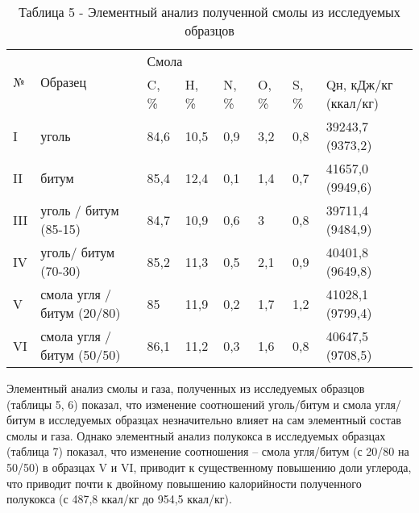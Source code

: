 \begin{table}[H]
\caption*{Таблица 5 - Элементный анализ полученной смолы из исследуемых образцов}
\centering
\begin{tabular}{|l|l|llllll|}
\hline
\multirow{2}{*}{№} & \multirow{2}{*}{Образец} & \multicolumn{6}{l|}{Смола} \\ \cline{3-8}
 &  & \multicolumn{1}{l|}{C, \%} & \multicolumn{1}{l|}{H, \%} & \multicolumn{1}{l|}{N, \%} & \multicolumn{1}{l|}{O, \%} & \multicolumn{1}{l|}{S, \%} & Qн, кДж/кг (ккал/кг) \\ \hline
I & уголь & \multicolumn{1}{l|}{84,6} & \multicolumn{1}{l|}{10,5} & \multicolumn{1}{l|}{0,9} & \multicolumn{1}{l|}{3,2} & \multicolumn{1}{l|}{0,8} & 39243,7 (9373,2) \\ \hline
II & битум & \multicolumn{1}{l|}{85,4} & \multicolumn{1}{l|}{12,4} & \multicolumn{1}{l|}{0,1} & \multicolumn{1}{l|}{1,4} & \multicolumn{1}{l|}{0,7} & 41657,0 (9949,6) \\ \hline
III & уголь / битум (85-15) & \multicolumn{1}{l|}{84,7} & \multicolumn{1}{l|}{10,9} & \multicolumn{1}{l|}{0,6} & \multicolumn{1}{l|}{3} & \multicolumn{1}{l|}{0,8} & 39711,4 (9484,9) \\ \hline
IV & уголь/ битум (70-30) & \multicolumn{1}{l|}{85,2} & \multicolumn{1}{l|}{11,3} & \multicolumn{1}{l|}{0,5} & \multicolumn{1}{l|}{2,1} & \multicolumn{1}{l|}{0,9} & 40401,8 (9649,8) \\ \hline
V & смола угля / битум (20/80) & \multicolumn{1}{l|}{85} & \multicolumn{1}{l|}{11,9} & \multicolumn{1}{l|}{0,2} & \multicolumn{1}{l|}{1,7} & \multicolumn{1}{l|}{1,2} & 41028,1 (9799,4) \\ \hline
VI & смола угля / битум (50/50) & \multicolumn{1}{l|}{86,1} & \multicolumn{1}{l|}{11,2} & \multicolumn{1}{l|}{0,3} & \multicolumn{1}{l|}{1,6} & \multicolumn{1}{l|}{0,8} & 40647,5 (9708,5) \\ \hline
\end{tabular}
\end{table}

\begin{multicols}{2}
Элементный анализ смолы и газа, полученных из исследуемых образцов
(таблицы 5, 6) показал, что изменение соотношений уголь/битум и смола
угля/битум в исследуемых образцах незначительно влияет на сам элементный
состав смолы и газа. Однако элементный анализ полукокса в исследуемых
образцах (таблица 7) показал, что изменение соотношения -- смола
угля/битум (с 20/80 на 50/50) в образцах V и VI, приводит к
существенному повышению доли углерода, что приводит почти к двойному
повышению калорийности полученного полукокса (с 487,8 ккал/кг до 954,5
ккал/кг).
\end{multicols}

